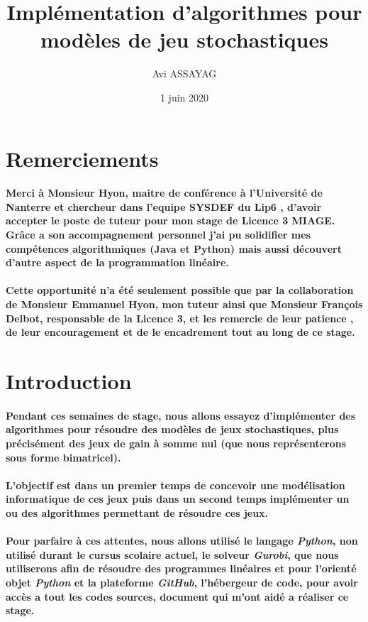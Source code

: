 \documentclass[a4paper, 12pt, twoside]{article}
\author{Avi ASSAYAG}
\title{Implémentation d'algorithmes pour modèles de jeu stochastiques}
\date{1 juin 2020}
\begin{document}
\pagedegarde


\section*{Remerciements}
\paragraph{Merci à Monsieur Hyon, maitre de conférence à l'Université de Nanterre et chercheur dans l'equipe SYSDEF du Lip6 , d'avoir accepter le poste de tuteur pour mon stage de Licence 3 MIAGE. Grâce a son accompagnement personnel j'ai pu solidifier mes compétences algorithmiques (Java et Python) mais aussi découvert d'autre aspect de la programmation linéaire. }

\paragraph{Cette opportunité n'a été seulement possible que par la collaboration de Monsieur Emmanuel Hyon, mon tuteur ainsi que Monsieur François Delbot, responsable de la Licence 3, et les remercie de leur patience , de leur encouragement et de le encadrement tout au long de ce stage. }
\newpage

\tableofcontents
\newpage

\section{Introduction}
\paragraph{Pendant ces semaines de stage, nous allons essayez d'implémenter des algorithmes pour résoudre des modèles de jeux stochastiques, plus précisément des jeux  de gain à somme nul (que nous représenterons sous forme bimatricel).} 
\paragraph{L'objectif est dans un premier temps de concevoir une modélisation informatique de ces jeux puis dans un second temps implémenter un ou des algorithmes permettant de résoudre ces jeux.}
\paragraph{Pour parfaire à ces attentes, nous allons utilisé le langage \textit{Python}, non utilisé durant le cursus scolaire actuel, le solveur \textit{Gurobi}, que nous utiliserons afin de résoudre des programmes linéaires et pour l'orienté objet \textit{Python} et la plateforme \textit{GitHub}, l'hébergeur de code, pour avoir accès a tout les codes sources, document qui m'ont aidé a réaliser ce stage.}
\end{document}
